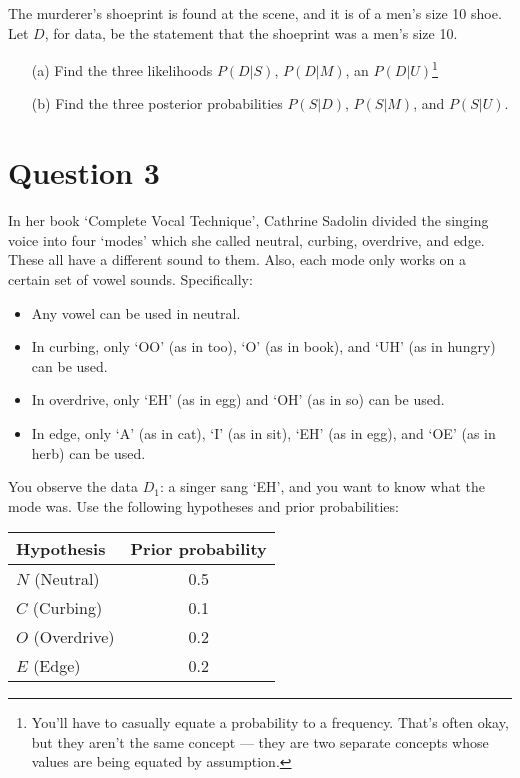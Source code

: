 \documentclass[a4paper, 12pt]{article}
\begin{document}
The murderer's shoeprint is found at the scene, and it is
of a men's size 10 shoe. Let $D$, for data, be the statement that the
shoeprint was a men's size 10.

\begin{enumerate}
\item [(a)] Find the three likelihoods
$P(D|S)$, $P(D|M)$, an $P(D|U)$\footnote{You'll have to casually equate
a probability to a frequency. That's often okay, but they aren't the
same concept --- they are two separate concepts whose values are being
equated by assumption.}
\item [(b)] Find the three posterior probabilities $P(S|D)$, $P(S|M)$,
and $P(S|U)$.
\end{enumerate}


\section*{Question 3}
In her book `Complete Vocal Technique', Cathrine Sadolin divided
the singing voice into four `modes' which she called neutral, curbing, overdrive,
and edge. These all have a different sound to them. Also, each mode
only works on a certain set of vowel sounds.
Specifically:
\begin{itemize}
\item Any vowel can be used in neutral.
\item In curbing, only `OO' (as in too), `O' (as in book), and `UH' (as in hungry) can be used.
\item In overdrive, only `EH' (as in egg) and `OH' (as in so) can be used.
\item In edge, only `A' (as in cat), `I' (as in sit), `EH' (as in egg), and `OE' (as in herb) can be used.
\end{itemize}

You observe the data $D_1$: a singer sang `EH',
and you want to know what the mode was.
Use the following hypotheses and prior probabilities:

\begin{table}[!ht]
\centering
\begin{tabular}{|l|c|}
\hline
Hypothesis & Prior probability \\
\hline
$N$ (Neutral)   & 0.5 \\
$C$ (Curbing)   & 0.1 \\
$O$ (Overdrive) & 0.2 \\
$E$ (Edge)      & 0.2 \\
\hline
\end{tabular}
\end{table}
\end{document}
